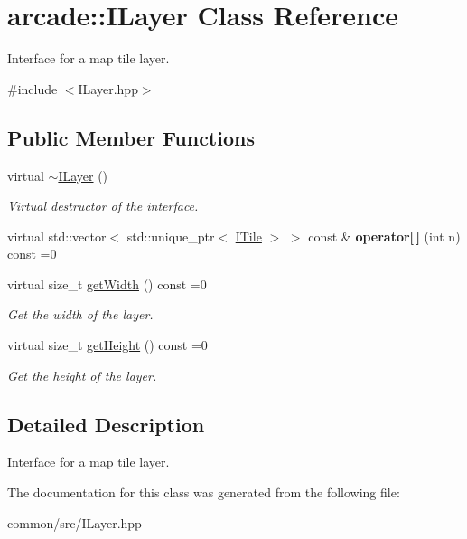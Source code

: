 \hypertarget{classarcade_1_1ILayer}{}\section{arcade\+:\+:I\+Layer Class Reference}
\label{classarcade_1_1ILayer}


Interface for a map tile layer.  




{\ttfamily \#include $<$I\+Layer.\+hpp$>$}

\subsection*{Public Member Functions}
\begin{DoxyCompactItemize}
\item 
\mbox{\label{classarcade_1_1ILayer_ac61832621733d6adc0bf5ac585643fa8}} 
virtual \hyperlink{classarcade_1_1ILayer_ac61832621733d6adc0bf5ac585643fa8}{$\sim$\+I\+Layer} ()
\begin{DoxyCompactList}\small\item\em Virtual destructor of the interface. \end{DoxyCompactList}\item 
\mbox{\label{classarcade_1_1ILayer_af444f3dca0e6e9976d00feb1ea41265f}} 
virtual std\+::vector$<$ std\+::unique\+\_\+ptr$<$ \hyperlink{classarcade_1_1ITile}{I\+Tile} $>$ $>$ const  \& {\bfseries operator\mbox{[}$\,$\mbox{]}} (int n) const =0
\item 
\mbox{\label{classarcade_1_1ILayer_ae80dc29ae33af872d7f531afe70bd7dd}} 
virtual size\+\_\+t \hyperlink{classarcade_1_1ILayer_ae80dc29ae33af872d7f531afe70bd7dd}{get\+Width} () const =0
\begin{DoxyCompactList}\small\item\em Get the width of the layer. \end{DoxyCompactList}\item 
\mbox{\label{classarcade_1_1ILayer_a79103ee447bda5c00edb8bef74e420fc}} 
virtual size\+\_\+t \hyperlink{classarcade_1_1ILayer_a79103ee447bda5c00edb8bef74e420fc}{get\+Height} () const =0
\begin{DoxyCompactList}\small\item\em Get the height of the layer. \end{DoxyCompactList}\end{DoxyCompactItemize}


\subsection{Detailed Description}
Interface for a map tile layer. 

The documentation for this class was generated from the following file\+:\begin{DoxyCompactItemize}
\item 
common/src/I\+Layer.\+hpp\end{DoxyCompactItemize}
